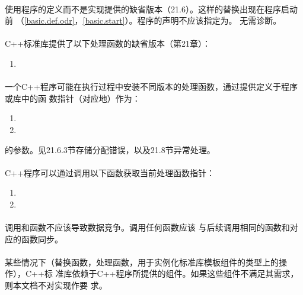 \paragraph{}
使用程序的定义而不是实现提供的缺省版本（21.6）。这样的替换出现在程序启动前
（\ref{basic.def.odr}，\ref{basic.start}）。程序的声明不应该指定为。
无需诊断。

\paragraph{}
C++标准库提供了以下处理函数的缺省版本（第21章）：
\begin{enumerate}
  \item{}
\end{enumerate}

\paragraph{}
一个C++程序可能在执行过程中安装不同版本的处理函数，通过提供定义于程序或库中的函
数指针（对应地）作为：
\begin{enumerate}
  \item{}
  \item{}
\end{enumerate}
的参数。见21.6.3节存储分配错误，以及21.8节异常处理。

\paragraph{}
C++程序可以通过调用以下函数获取当前处理函数指针：
\begin{enumerate}
  \item{}
  \item{}
\end{enumerate}

\paragraph{}
调用和函数不应该导致数据竞争。调用任何函数应该
与后续调用相同的函数和对应的函数同步。

\paragraph{}
某些情况下（替换函数，处理函数，用于实例化标准库模板组件的类型上的操作），C++标
准库依赖于C++程序所提供的组件。如果这些组件不满足其需求，则本文档不对实现作要
求。

